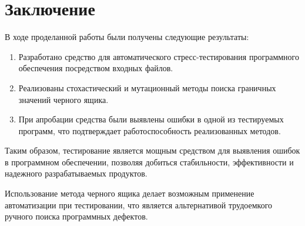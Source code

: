 \documentclass[a4paper,14pt,href]{article}
\begin{document}
\section*{Заключение}
	В ходе проделанной работы были получены следующие результаты:
\begin{enumerate}
\item Разработано средство для автоматического стресс-тестирования программного обеспечения посредством входных файлов.

\item Реализованы стохастический и мутационный методы поиска граничных значений черного ящика.

\item При апробации средства были выявлены ошибки в одной из тестируемых программ, что подтверждает работоспособность реализованных методов.
\end{enumerate}

	Таким образом, тестирование является мощным средством для выявления ошибок в программном обеспечении, позволяя добиться стабильности, эффективности и надежного разрабатываемых продуктов.

Использование метода черного ящика делает возможным применение автоматизации при тестировании, что является альтернативой трудоемкого ручного поиска программных дефектов.

\newpage
{}



\end{document}
